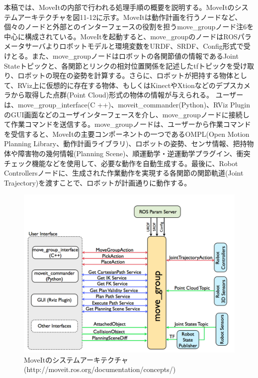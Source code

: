 本稿では、MoveItの内部で行われる処理手順の概要を説明する。MoveItのシステムアーキテクチャを図11-12に示す。MoveItは動作計画を行うノードなど、個々のノードと外部とのインターフェースの役割を担うmove\_groupノード注6を中心に構成されている。MoveItを起動すると、move\_groupのノードはROSパラメータサーバよりロボットモデルと環境変数をURDF、SRDF、Config形式で受けとる。また、move\_groupノードはロボットの各関節値の情報であるJoint Stateトピックと、各関節とリンクの相対位置関係を記述したtfトピックを受け取り、ロボットの現在の姿勢を計算する。さらに、ロボットが把持する物体として、RViz上に仮想的に存在する物体、もしくはKinectやXtionなどのデプスカメラから取得した点群(Point Cloud)形式の物体の情報が与えられる。
ユーザーは、move\_group\_interface(C ++)、moveit\_commander(Python)、RViz PluginのGUI画面などのユーザインターフェースを介し、move\_groupノードに接続して作業コマンドを送信する。move\_groupノードは、ユーザーから作業コマンドを受信すると、MoveItの主要コンポーネントの一つであるOMPL(Open Motion Planning Library、動作計画ライブラリ)、ロボットの姿勢、センサ情報、把持物体や障害物の幾何情報(Planning Scene)、順運動学・逆運動学プラグイン、衝突チェック機能などを使用して、必要な動作を自動生成する。最後に、Robot Controllersノードに、生成された作業動作を実現する各関節の関節軌道(Joint Trajectory)を渡すことで、ロボットが計画通りに動作する。

\begin{figure}[htp]
  \centering
  \includegraphics[width=12cm]{pictures/chapter11/pic_11_12.png}
  \caption{MoveItのシステムアーキテクチャ(http://moveit.ros.org/documentation/concepts/)}
\end{figure}


